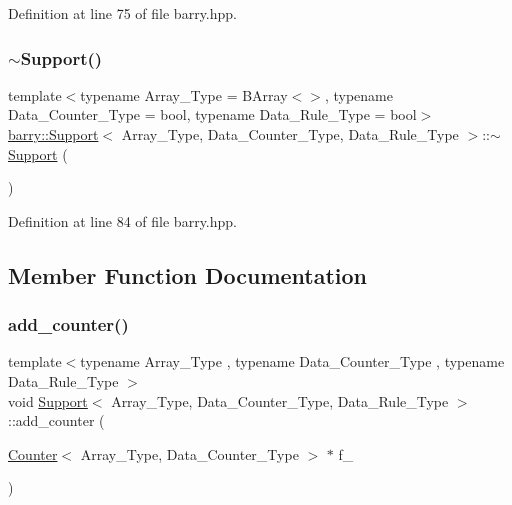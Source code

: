 Definition at line 75 of file barry.\+hpp.

\mbox{\label{classbarry_1_1_support_a4ea99cc1691b04b76a333e851aab4b64}} 
\subsubsection{\texorpdfstring{$\sim$\+Support()}{~Support()}}
{\footnotesize\ttfamily template$<$typename Array\+\_\+\+Type  = B\+Array$<$$>$, typename Data\+\_\+\+Counter\+\_\+\+Type  = bool, typename Data\+\_\+\+Rule\+\_\+\+Type  = bool$>$ \\
\hyperlink{classbarry_1_1_support}{barry\+::\+Support}$<$ Array\+\_\+\+Type, Data\+\_\+\+Counter\+\_\+\+Type, Data\+\_\+\+Rule\+\_\+\+Type $>$\+::$\sim$\hyperlink{classbarry_1_1_support}{Support} (\begin{DoxyParamCaption}{ }\end{DoxyParamCaption})\hspace{0.3cm}{\ttfamily [inline]}}



Definition at line 84 of file barry.\+hpp.



\subsection{Member Function Documentation}
\mbox{\label{classbarry_1_1_support_a364df2c6295341f2801ebe0419d1d97c}} 
\subsubsection{\texorpdfstring{add\+\_\+counter()}{add\_counter()}\hspace{0.1cm}{\footnotesize\ttfamily [1/2]}}
{\footnotesize\ttfamily template$<$typename Array\+\_\+\+Type , typename Data\+\_\+\+Counter\+\_\+\+Type , typename Data\+\_\+\+Rule\+\_\+\+Type $>$ \\
void \hyperlink{classbarry_1_1_support}{Support}$<$ Array\+\_\+\+Type, Data\+\_\+\+Counter\+\_\+\+Type, Data\+\_\+\+Rule\+\_\+\+Type $>$\+::add\+\_\+counter (\begin{DoxyParamCaption}\item[{\hyperlink{classbarry_1_1_counter}{Counter}$<$ Array\+\_\+\+Type, Data\+\_\+\+Counter\+\_\+\+Type $>$ $\ast$}]{f\+\_\+ }\end{DoxyParamCaption})\hspace{0.3cm}{\ttfamily [inline]}}



